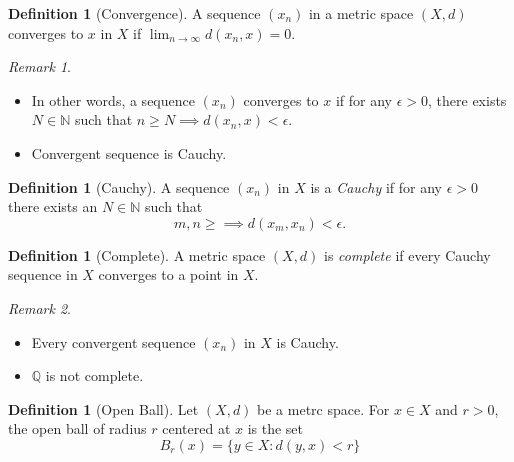 \documentclass[12pt, lettersize]{book}
\theoremstyle{plain}
\theoremstyle{definition}
\newtheorem{dfn}[thm]{Definition}
\theoremstyle{remark}
\newtheorem*{rem}{Remark}
\newcommand{\N}{\mathbb{N}}
\newcommand{\Q}{\mathbb{Q}}
\begin{document}
	\begin{dfn}[Convergence]
		A sequence $(x_n)$ in a metric space $(X,d)$ converges to $x$ in $X$ if $\lim_{n\rightarrow\infty}d(x_n,x)=0$.
	\end{dfn}
	\begin{rem}
		\begin{itemize}
			\item In other words, a sequence $(x_n)$ converges to $x$ if for any $\epsilon>0$, there exists $N\in\N$ such that $n\geq N\implies d(x_n,x)<\epsilon$.
			\item Convergent sequence is Cauchy.
		\end{itemize}
	\end{rem}
	
	\begin{dfn}[Cauchy]
		A sequence $(x_n)$ in $X$ is a \emph{Cauchy} if for any $\epsilon>0$ there exists an $N\in\N$ such that
		\begin{displaymath}
			m,n\geq\implies d(x_m,x_n)<\epsilon.
		\end{displaymath}
	\end{dfn}
	
	\begin{dfn}[Complete]
		A metric space $(X,d)$ is \emph{complete} if every Cauchy sequence in $X$ converges to a point in $X$.
	\end{dfn}
	\begin{rem}
		\begin{itemize}
			\item Every convergent sequence $(x_n)$ in $X$ is Cauchy.
			\item $\Q$ is not complete. 
		\end{itemize}
	\end{rem}
	
	\begin{dfn}[Open Ball]
		Let $(X,d)$ be a metrc space. For $x\in X$ and $r>0$, the open ball of radius $r$ centered at $x$ is the set
		\begin{displaymath}
			B_r(x)=\{y\in X: d(y,x)<r\}
		\end{displaymath}
	\end{dfn}
	
\end{document}
